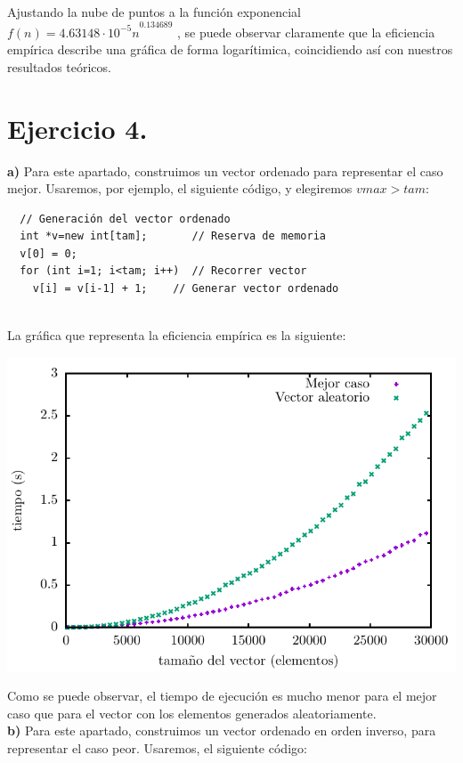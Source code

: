 \documentclass[11pt,a4paper]{article}
\begin{document}
Ajustando la nube de puntos a la función exponencial $f(n) = {4.63148 \cdot 10^{-5}n}^{0.134689}$ , se puede observar claramente que la eficiencia empírica describe una gráfica de forma logarítimica, coincidiendo así con nuestros resultados teóricos.

\section*{Ejercicio 4.}

\textbf{a)} Para este apartado, construimos un vector ordenado para representar el caso mejor. Usaremos, por ejemplo, el siguiente código, y elegiremos $vmax > tam$:

\begin{lstlisting}
  // Generación del vector ordenado
  int *v=new int[tam];       // Reserva de memoria
  v[0] = 0;
  for (int i=1; i<tam; i++)  // Recorrer vector
    v[i] = v[i-1] + 1;    // Generar vector ordenado
\end{lstlisting}
\hfill \\
La gráfica que representa la eficiencia empírica es la siguiente:

\begin{center}
	\includegraphics{img/tiempos_burbuja_mejor_caso.pdf}
\end{center}

Como se puede observar, el tiempo de ejecución es mucho menor para el mejor caso que para el vector con los elementos generados aleatoriamente.\\

\textbf{b)} Para este apartado, construimos un vector ordenado en orden inverso, para representar el caso peor. Usaremos, el siguiente código:
\end{document}
